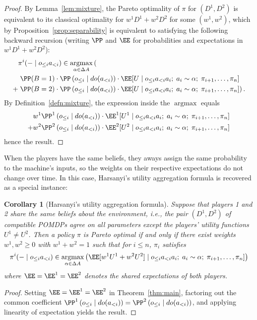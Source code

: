\documentclass{article}  %
\newcommand{\hist}[1]{o_{\le #1}a_{<#1}}
\newcommand{\dohist}[1]{o_{\le #1} \mid do(a_{<#1})}
\newcommand{\bool}{B}
\newcommand{\lem}[1]{Lemma~\ref{lem:#1}}
\newcommand{\thm}[1]{Theorem~\ref{thm:#1}}
\newcommand{\defn}[1]{Definition~\ref{defn:#1}}
\newcommand{\prop}[1]{Proposition~\ref{prop:#1}}
\DeclareMathOperator*{\argmax}{argmax}
\newtheorem{corollary}[theorem]{Corollary}
\begin{document}
\begin{proof}
By \lem{mixture}, the Pareto optimality of $\pi$ for $(D^1,D^2)$ is equivalent to its classical optimality for
$w^1D^1 + w^2D^2$ for some $(w^1,w^2)$, which by \prop{separability} is equivalent to satisfying the following backward recursion (writing $\PP$ and $\EE$ for probabilities and expectations in $w^1D^1 + w^2D^2$):
\begin{align*}
&\pi^i(-\mid\hist{i}) \in \argmax_{\alpha\in\Delta A} \left(\vphantom{\left(\left(\right)\right)}\right.\\
& \left.\PP(\bool =1)\cdot \PP\left(\dohist{i}\right)\cdot \EE[U \mid \hist{i} a_i ;\; a_i\sim \alpha;\; \pi_{i+1},\ldots,\pi_n]\right.\\
+ & \left.\PP(\bool =2)\cdot \PP\left(\dohist{i}\right)\cdot \EE[U \mid \hist{i} a_i;\; a_i\sim \alpha;\; \pi_{i+1},\ldots,\pi_n] \right).
\end{align*}
By \defn{mixture}, the expression inside the $\argmax$ equals 
\begin{align*}
& w^1 \PP^1\left(\dohist{i}\right)\cdot \EE^1[U^1 \mid \hist{i} a_i ;\; a_i\sim \alpha;\; \pi_{i+1},\ldots,\pi_n]\\
+ & w^2 \PP^2\left(\dohist{i}\right)\cdot \EE^2[U^2 \mid \hist{i} a_i;\; a_i\sim \alpha;\; \pi_{i+1},\ldots,\pi_n]
\end{align*}
hence the result.
\end{proof}

When the players have the same beliefs, they aways assign the same probability to the machine's inputs, so the weights on their respective expectations do not change over time.  In this case, Harsanyi's utility aggregation formula is recovered as a special instance:

\begin{corollary}[Harsanyi's utility aggregation formula]\label{cor:harsanyi}
Suppose that players 1 and 2 share the same beliefs about the environment, i.e., the pair $(D^1,D^2)$ of compatible POMDPs agree on all parameters except the players' utility functions $U^1\neq U^2$. Then a policy $\pi$ is Pareto optimal if and only if there exist weights $w^1,w^2\geq 0$ with $w^1+w^2=1$ such that for $i\le n$, $\pi_i$ satisfies
\[
\pi^i(-\mid\hist{i}) \in \argmax_{\alpha\in\Delta A} \left(\EE[w^1U^1+w^2U^2] \mid \hist{i} a_i ;\; a_i\sim \alpha;\; \pi_{i+1},\ldots,\pi_n]\right)
\]
where $\EE=\EE^1=\EE^2$ denotes the shared expectations of both players.
\end{corollary}
\begin{proof}
Setting $\EE=\EE^1=\EE^2$ in \thm{main}, factoring out the common coefficient $\PP^1\left(\dohist{i}\right)=\PP^2\left(\dohist{i}\right)$, and applying linearity of expectation yields the result.
\end{proof}
\end{document}
